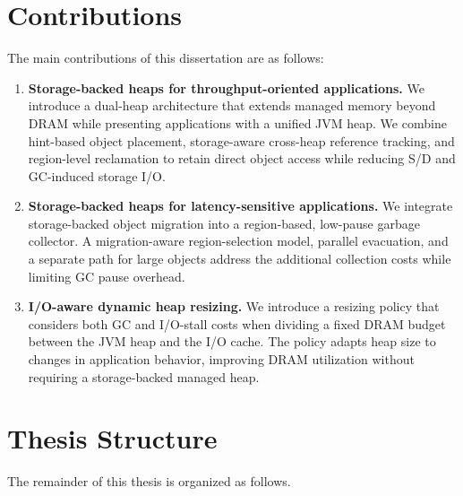 \begin{center}
\end{center}

\section{Contributions}

The main contributions of this dissertation are as follows:

\begin{enumerate}

	\item \textbf{Storage-backed heaps for throughput-oriented applications.}
	      We introduce a dual-heap architecture that extends managed memory beyond DRAM while presenting applications with a unified JVM heap.
	      We combine hint-based object placement, storage-aware cross-heap reference tracking, and region-level reclamation to retain direct object access while reducing S/D and GC-induced storage I/O.

	\item \textbf{Storage-backed heaps for latency-sensitive applications.}
	      We integrate storage-backed object migration into a region-based, low-pause garbage collector.
	      A migration-aware region-selection model, parallel evacuation, and a separate path for large objects address the additional collection costs while limiting GC pause overhead.

	\item \textbf{I/O-aware dynamic heap resizing.}
	      We introduce a resizing policy that considers both GC and I/O-stall costs when dividing a fixed DRAM budget between the JVM heap and the I/O cache.
	      The policy adapts heap size to changes in application behavior, improving DRAM utilization without requiring a storage-backed managed heap.

\end{enumerate}

\clearpage
\section{Thesis Structure}

The remainder of this thesis is organized as follows.

